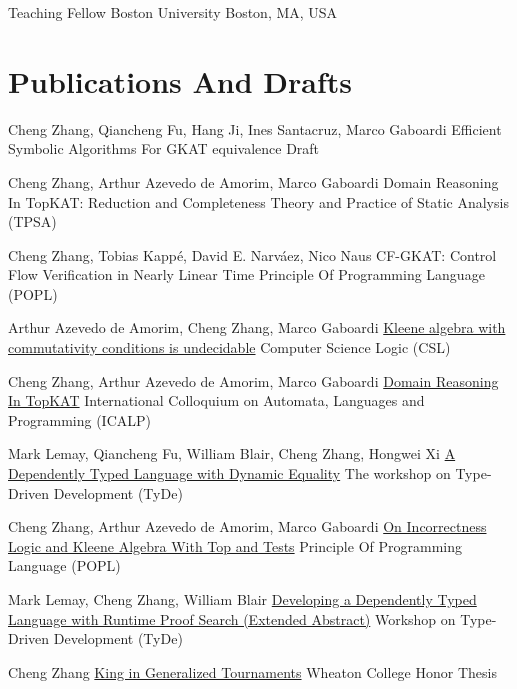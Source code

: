 \documentclass[10pt]{moderncv}        %
\let\oldsection=\section
\renewcommand{\section}{%
  \needspace{\baselineskip}
  \oldsection
}
\begin{document}
{Teaching Fellow}
{Boston University}
{Boston, MA, USA}{}
{%
}

\section{Publications And Drafts}

{Cheng Zhang, Qiancheng Fu, Hang Ji, Ines Santacruz, Marco Gaboardi}
{Efficient Symbolic Algorithms For GKAT equivalence}
{Draft}
{}{}

{Cheng Zhang, Arthur Azevedo de Amorim, Marco Gaboardi}
{Domain Reasoning In TopKAT: Reduction and Completeness}
{Theory and Practice of Static Analysis (TPSA)}
{}{}

{Cheng Zhang, Tobias Kappé, David E. Narváez, Nico Naus}
{CF-GKAT: Control Flow Verification in Nearly Linear Time}
{Principle Of Programming Language (POPL)}
{}{}

{Arthur Azevedo de Amorim, Cheng Zhang, Marco Gaboardi}
{\href{https://hal.science/hal-04534715/}{Kleene algebra with commutativity conditions is undecidable}}
{Computer Science Logic (CSL)}
{}{}

{Cheng Zhang, Arthur Azevedo de Amorim, Marco Gaboardi}
{\href{https://arxiv.org/abs/2404.18417}{Domain Reasoning In TopKAT}}
{International Colloquium on Automata, Languages and Programming (ICALP)}
{}{}

{Mark Lemay, Qiancheng Fu, William Blair, Cheng Zhang, Hongwei Xi}
{\href{https://doi.org/10.1145/3609027.3609407}{A Dependently Typed Language with Dynamic Equality}}
{The workshop on Type-Driven Development (TyDe)}
{}{}

{Cheng Zhang, Arthur Azevedo de Amorim, Marco Gaboardi}
{\href{https://arxiv.org/abs/2108.07707}{On Incorrectness Logic and Kleene Algebra With Top and Tests}}
{Principle Of Programming Language (POPL)}
{}{}

{Mark Lemay, Cheng Zhang, William Blair}
{\href{https://icfp20.sigplan.org/details/tyde-2020-papers/7/Developing-a-Dependently-Typed-Language-with-Runtime-Proof-Search-Extended-Abstract-}
{Developing a Dependently Typed Language with Runtime Proof Search (Extended Abstract)}}
{Workshop on Type-Driven Development (TyDe)}
{}{}

{Cheng Zhang}
{\href{http://hdl.handle.net/11040/24570}{King in Generalized Tournaments}}
{Wheaton College Honor Thesis}
{}{}
\end{document}

